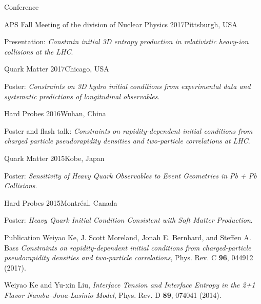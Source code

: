 \documentclass{resume} %
\begin{document}
\begin{rSection}{Conference}

\begin{rSubsection}{APS Fall Meeting of the division of Nuclear Physics 2017}{Pittsburgh, USA}{}{}
\item {Presentation: \it Constrain initial 3D entropy production in relativistic heavy-ion collisions at the LHC}.
\end{rSubsection}

\begin{rSubsection}{Quark Matter 2017}{Chicago, USA}{}{}
\item {Poster: \it Constraints on 3D hydro initial conditions from experimental data and systematic predictions of longitudinal observables}.
\end{rSubsection}

\begin{rSubsection}{Hard Probes 2016}{Wuhan, China}{}{}
\item {Poster and flash talk: \it Constraints on rapidity-dependent initial conditions from charged particle pseudorapidity densities and two-particle correlations at LHC}.
\end{rSubsection}

\begin{rSubsection}{Quark Matter 2015}{Kobe, Japan}{}{}
\item {Poster: \it Sensitivity of Heavy Quark Observables to Event Geometries in Pb + Pb Collisions}.
\end{rSubsection}

\begin{rSubsection}{Hard Probes 2015}{Montr\'eal, Canada}{}{}
\item {Poster: \it Heavy Quark Initial Condition Consistent with Soft Matter Production}.
\end{rSubsection}

\end{rSection}

\begin{rSection}{Publication}
Weiyao Ke, J. Scott Moreland, Jonah E. Bernhard, and Steffen A. Bass {\it Constraints on rapidity-dependent initial conditions from charged-particle pseudorapidity densities and two-particle correlations}, Phys. Rev. C {\bf 96}, 044912 (2017).

Weiyao Ke and Yu-xin Liu, {\it Interface Tension and Interface Entropy in the 2+1 Flavor Nambu--Jona-Lasinio Model}, Phys. Rev. D {\bf 89}, 074041 (2014).

\end{rSection}





\end{document}
